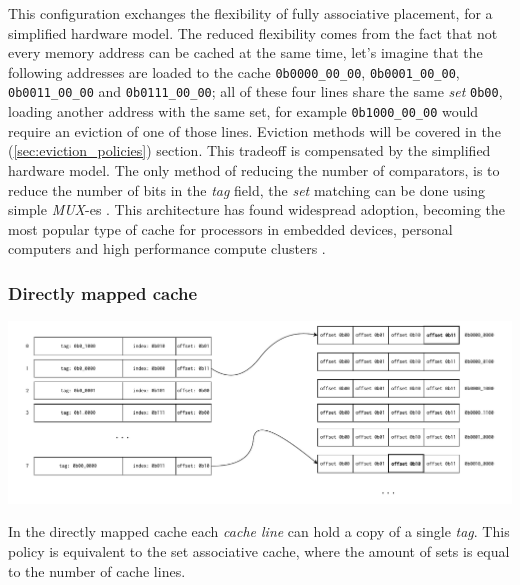 \noindent This configuration exchanges the flexibility of fully associative placement, for a simplified hardware model. The reduced flexibility comes from the fact that
not every memory address can be cached at the same time, let's imagine that the following addresses are loaded to the cache \texttt{0b0000\_00\_00}, \texttt{0b0001\_00\_00}, \texttt{0b0011\_00\_00}
and \texttt{0b0111\_00\_00}; all of these four lines share the same \textit{set} \texttt{0b00}, loading another address with the same set, for example \texttt{0b1000\_00\_00} would require 
an eviction of one of those lines. Eviction methods will be covered in the (\ref{sec:eviction_policies}) section. 
This tradeoff is compensated by the simplified hardware model. The only method of reducing the number of comparators, is to reduce the number of bits in the \textit{tag} field, the \textit{set}
matching can be done using simple \textit{MUX}-es \cite{whatevery}. %
This architecture has found widespread adoption, becoming the most popular type of cache for processors in embedded devices, personal computers and high performance compute clusters
\cite{digitaldesgnandcomp} \cite{evalofcaceh}.

\subsubsection{Directly mapped cache}
\begin{center}
	\centering
	\includegraphics[width=\textwidth]{figures/02-background/dir_map_mem.pdf}
	\label{fig:dir_map_mem}
\end{center}

\noindent In the directly mapped cache each \textit{cache line} can hold a copy of a single \textit{tag}. This policy is equivalent to the set associative cache, where the amount of sets is equal to
the number of cache lines.

